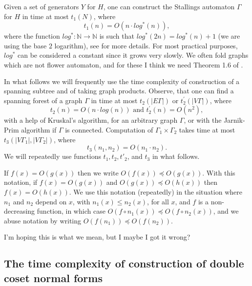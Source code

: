 \documentclass[a4paper,12pt]{article}
\newcommand{\G}{\Gamma }
\numberwithin{equation}{section}
\numberwithin{figure}{section}
\newcommand{\NN}{\ensuremath{\mathbb{N}}}
\begin{document}
Given a set of generators $Y$ for $H$, one can construct the
Stallings automaton $\G$ for $H$ in time at most $t_1(N)$, where
\begin{equation}\label{t1} t_1(n) = O (n \cdot log^{\ast}(n)),
\end{equation}
where the function $log^{\ast}: \NN \rightarrow \NN$ is such that
$log^{\ast}(2n) = log^{\ast}(n) + 1$ (we are using the base $2$
logarithm), see \cite{touikan06} for more details. For most
practical purposes, $log^{\ast}$ can be considered a constant
since it grows very slowly.
{\ajd We often fold graphs which are not flower automaton, and 
for these I think we need Theorem 1.6 of \cite{touikan06}.}

In what follows we will  frequently  use the time complexity of 
 construction of a spanning subtree and of taking graph
products. 
Observe, that one can find a spanning forest of a graph $\G$ in
time at most $t_2(|E\G|)$ or $t^{\prime}_2(|V\G|)$, where
\begin{equation}\label{t2}
t_2(n) = O(n \cdot log(n)) {\textrm{ and }} t^{\prime}_2(n) =
O(n^2),
\end{equation}
with a help of Kruskal's algorithm, for an arbitrary graph $\G$, or with 
the Jarnik-Prim  algorithm if $\G$ is connected. 
Computation of $\G_1 \times \G_2$ takes time at most $t_3(|V\G_1|,
|V\G_2|)$, where 
\begin{equation}\label{t3}
t_3(n_1, n_2) = O(n_1 \cdot n_2).
\end{equation}
We will repeatedly use  functions $t_1, t_2, t'_2$,
and $t_3$ in what follows.

If $f(x)=O(g(x))$ then we write $O(f(x))\preceq O(g(x))$. With
this notation, if $f(x)=O(g(x))$ and $O(g(x))\preceq O(h(x))$ then
$f(x)=O(h(x))$.  We use this notation (repeatedly) in the situation
where $n_1$ and $n_2$ depend on $x$, with $n_1(x)\le n_2(x)$, for all $x$,
and $f$ is a non-decreasing function, in which case 
$O(f\circ n_1(x))\preceq O(f\circ n_2(x))$, and we abuse notation by
writing $O(f(n_1)) \preceq O(f(n_2))$.

{\ajd I'm hoping this is what we mean, but I maybe I got it wrong?}

\subsection{The time complexity of construction of double coset normal forms}\label{sub:doubleCo_nf}
\end{document}
